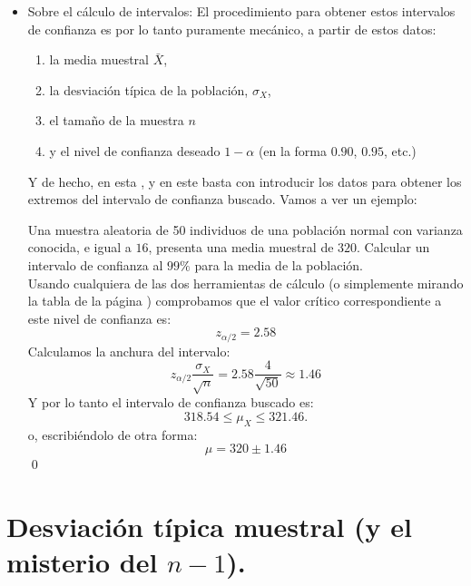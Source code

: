 \begin{itemize}
       \item {\sf Sobre el cálculo de intervalos:} El procedimiento para obtener estos intervalos de confianza es por lo tanto puramente mecánico, a partir de estos datos:
       \begin{enumerate}
       \item la media muestral $\bar X$,
       \item la desviación típica de la población, $\sigma_X$,
       \item el tamaño de la muestra $n$
       \item y el nivel de confianza deseado $1-\alpha$ (en la forma $0.90$, $0.95$, etc.)
       \end{enumerate}
       Y de hecho, en esta , y en este  basta con introducir los datos para obtener los extremos del intervalo de confianza buscado. Vamos a ver un ejemplo:
       \begin{ejemplo}
       Una muestra aleatoria de 50 individuos de una población normal con varianza conocida, e igual a $16$, presenta una media muestral de $320$. Calcular un intervalo de confianza al $99\%$ para la media de la población.\\
       Usando cualquiera de las dos herramientas de cálculo (o simplemente mirando la tabla de la página \pageref{tabla:valoresCriticosNormalEstandar}) comprobamos que el valor crítico correspondiente a este nivel de confianza es:
       \[z_{\alpha/2}=2.58\]
       Calculamos la anchura del intervalo:
       \[z_{\alpha/2}\dfrac{\sigma_X}{\sqrt{n}}=2.58\dfrac{4}{\sqrt{50}}\approx 1.46\]
       Y por lo tanto el intervalo de confianza buscado es:
       \[318.54\leq \mu_X\leq 321.46.\]
       o, escribiéndolo de otra forma:
       \[\mu=320\pm 1.46\]
       \quad\qed
       \end{ejemplo}

       \end{itemize}


       \section{Desviación típica muestral (y el misterio del $n-1$).}

